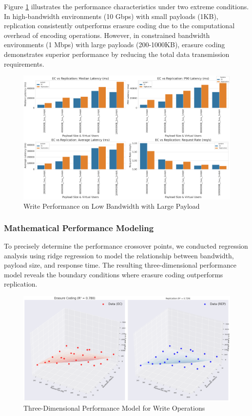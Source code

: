 Figure \ref{fig:write-performance-comparison} illustrates the performance characteristics under two extreme conditions. In high-bandwidth environments (10 Gbps) with small payloads (1KB), replication consistently outperforms erasure coding due to the computational overhead of encoding operations. However, in constrained bandwidth environments (1 Mbps) with large payloads (200-1000KB), erasure coding demonstrates superior performance by reducing the total data transmission requirements.

\begin{figure}[ht]
    \centering
    \includegraphics[width=\columnwidth]{resources/chapter-4/write_bigload_slownet.png}
    \caption{Write Performance on Low Bandwidth with Large Payload}
    \label{fig:write-performance-comparison}
\end{figure}

\subsubsection{Mathematical Performance Modeling}

To precisely determine the performance crossover points, we conducted regression analysis using ridge regression to model the relationship between bandwidth, payload size, and response time. The resulting three-dimensional performance model reveals the boundary conditions where erasure coding outperforms replication.

\begin{figure}[ht]
    \centering
    \includegraphics[width=\columnwidth]{resources/chapter-4/write_bigload_avgnet_regression.png}
    \caption{Three-Dimensional Performance Model for Write Operations}
    \label{fig:write-regression-model}
\end{figure}

